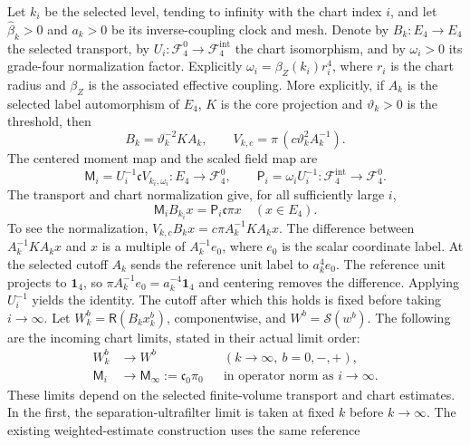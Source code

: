 Let $k_i$ be the selected level, tending to infinity with the chart index
$i$, and let $\widehat\beta_k>0$ and $a_k>0$ be its inverse-coupling clock
and mesh. Denote by $B_k:E_4\to E_4$ the selected transport, by $U_i:\mathcal F_4^0\to\mathcal F_4^{\mathrm{int}}$
the chart isomorphism, and by $\omega_i>0$ its grade-four normalization factor. Explicitly
$\omega_i=\beta_Z(k_i)r_i^4$, where $r_i$ is the chart radius and $\beta_Z$ is
the associated effective coupling. More explicitly, if $A_k$ is the selected label
automorphism of $E_4$, $K$ is the core projection and $\vartheta_k>0$ is
the threshold, then
\[
 B_k=\vartheta_k^{-2}K A_k,\qquad
 V_{k,c}=\pi\, (c\vartheta_k^2 A_k^{-1}).
\]
The centered moment map and the scaled field map are
\begin{equation}
 \mathsf M_i=U_i^{-1}\mathfrak c V_{k_i,\omega_i}:E_4\to\mathcal F_4^0,
 \qquad \mathsf P_i=\omega_iU_i^{-1}:\mathcal F_4^{\mathrm{int}}\to\mathcal F_4^0.
 \label{eq:ex-branch-moment-map}
\end{equation}
The transport and chart normalization give, for all sufficiently large $i$,
\begin{equation}
 \mathsf M_i B_{k_i}x=\mathsf P_i\mathfrak c\pi x
 \quad(x\in E_4).
 \label{eq:ex-branch-chart-identity}
\end{equation}
To see the normalization, $V_{k,c}B_kx=c\pi A_k^{-1}KA_kx$.
The difference between $A_k^{-1}KA_kx$ and $x$ is a multiple of
$A_k^{-1}e_0$, where $e_0$ is the scalar coordinate label. At the selected
cutoff $A_k$ sends the reference unit label to $a_k^4e_0$. The reference
unit projects to $\mathbf1_4$, so $\pi A_k^{-1}e_0=a_k^{-4}\mathbf1_4$
and centering removes the difference. Applying $U_i^{-1}$ yields the identity.
The cutoff after which this holds is fixed before taking $i\to\infty$.
Let $W^b_k=\mathsf R(B_kx^b_k)$, componentwise, and
$W^b=\mathcal S(w^b)$.
The following are the incoming chart limits, stated in their actual
limit order:
\begin{align}
 W^b_k&\longrightarrow W^b &&(k\to\infty,\ b=0,-,+),
 \label{eq:ex-branch-coefficient-input}\\
 \mathsf M_i&\longrightarrow \mathsf M_\infty:=\mathfrak c_0\pi_0
 &&\text{in operator norm as }i\to\infty.
 \label{eq:ex-branch-moment-input}
\end{align}
These limits depend on the selected finite-volume transport and chart
estimates. In the first, the separation-ultrafilter limit is taken at fixed
$k$ before $k\to\infty$.
The existing weighted-estimate construction uses the same reference
